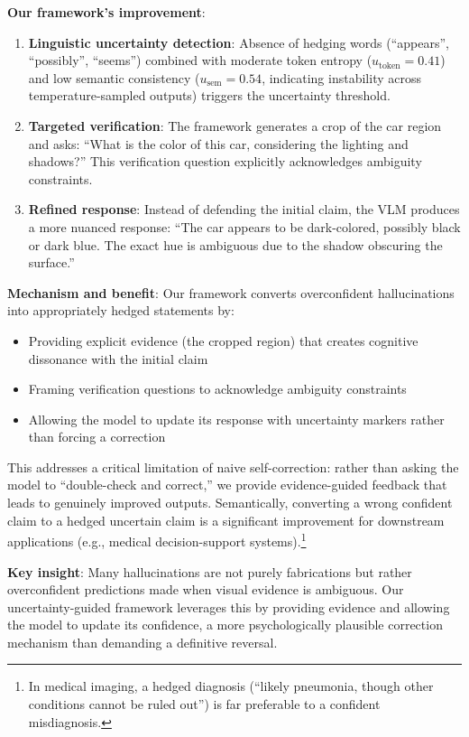 \documentclass[12pt]{article}
\begin{document}
\textbf{Our framework's improvement}:
\begin{enumerate}
    \item \textbf{Linguistic uncertainty detection}: Absence of hedging words 
    (``appears'', ``possibly'', ``seems'') combined with moderate token entropy 
    ($u_{\text{token}} = 0.41$) and low semantic consistency ($u_{\text{sem}} = 0.54$, 
    indicating instability across temperature-sampled outputs) triggers the uncertainty 
    threshold.
    
    \item \textbf{Targeted verification}: The framework generates a crop of the 
    car region and asks: ``What is the color of this car, considering the lighting 
    and shadows?'' This verification question explicitly acknowledges ambiguity 
    constraints.
    
    \item \textbf{Refined response}: Instead of defending the initial claim, the 
    VLM produces a more nuanced response: ``The car appears to be dark-colored, 
    possibly black or dark blue. The exact hue is ambiguous due to the shadow 
    obscuring the surface.''
\end{enumerate}

\textbf{Mechanism and benefit}: Our framework converts overconfident hallucinations 
into appropriately hedged statements by:
\begin{itemize}
    \item Providing explicit evidence (the cropped region) that creates cognitive 
    dissonance with the initial claim
    \item Framing verification questions to acknowledge ambiguity constraints
    \item Allowing the model to update its response with uncertainty markers rather 
    than forcing a correction
\end{itemize}

This addresses a critical limitation of naive self-correction: rather than asking 
the model to ``double-check and correct,'' we provide evidence-guided feedback 
that leads to genuinely improved outputs. Semantically, converting a wrong 
confident claim to a hedged uncertain claim is a significant improvement for 
downstream applications (e.g., medical decision-support systems).\footnote{In 
medical imaging, a hedged diagnosis (``likely pneumonia, though other conditions 
cannot be ruled out'') is far preferable to a confident misdiagnosis.}

\textbf{Key insight}: Many hallucinations are not purely fabrications but rather 
overconfident predictions made when visual evidence is ambiguous. Our uncertainty-guided 
framework leverages this by providing evidence and allowing the model to update 
its confidence, a more psychologically plausible correction mechanism than demanding 
a definitive reversal.
\end{document}
